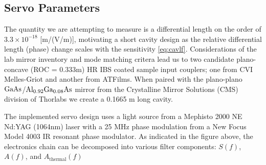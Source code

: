 \subsection{Servo Parameters}
The quantity we are attempting to measure is a differential length on the order of $3.3 \times 10^{-18}$ [m/(V/m)], motivating a short cavity design as the relative differential length (phase) change scales with the sensitivity \autoref{eq:cavlf}. Considerations of the lab mirror inventory and mode matching critera lead us to two candidate plano-concave (ROC = 0.333m) HR IBS coated sample input couplers; one from CVI Melles-Griot and another from ATFilms. When paired with the plano-plano $\mathrm{GaAs}$/$\mathrm{Al_{0.92}Ga_{0.08}As}$  mirror from the Crystalline Mirror Solutions (CMS) division of Thorlabs we create a 0.1665 m long cavity.


The implemented servo design uses a light source from a Mephisto 2000 NE Nd:YAG (1064nm) laser with a 25 MHz phase modulation from a New Focus Model 4003 IR resonant phase modulator. As indicated in the figure above, the electronics chain can be decomposed into various filter components: $S(f)$, $A(f)$, and $A_\mathrm{thermal}(f)$

